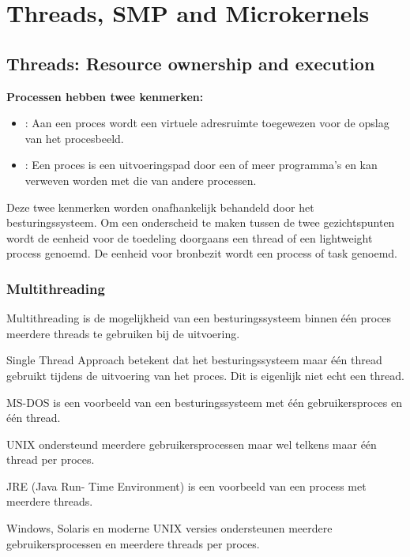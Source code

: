 \section{Threads, SMP and Microkernels}

\subsection{Threads: Resource ownership and execution}

\textbf{\textcolor{grayfilip}{Processen hebben twee kenmerken:}}

\begin{itemize}
    \item {} : Aan een proces wordt een virtuele adresruimte toegewezen voor de opslag van het procesbeeld.
    \item {}: Een proces is een uitvoeringspad door een of meer programma’s en kan verweven worden met die van andere processen.
\end{itemize}
	
Deze twee kenmerken worden onafhankelijk behandeld door het besturingssysteem.
Om een onderscheid te maken tussen de twee gezichtspunten wordt de eenheid voor de toedeling doorgaans een thread of een lightweight process genoemd. De eenheid voor bronbezit wordt een process of task genoemd.

\subsubsection{Multithreading}

Multithreading is de mogelijkheid van een besturingssysteem binnen één proces meerdere threads te gebruiken bij de uitvoering.

Single Thread Approach betekent dat het besturingssysteem maar één thread gebruikt tijdens de uitvoering van het proces. Dit is eigenlijk niet echt een thread.

MS-DOS is een voorbeeld van een besturingssysteem met één gebruikersproces en één thread.

UNIX ondersteund meerdere gebruikersprocessen maar wel telkens maar één thread per proces.

JRE (Java Run- Time Environment) is een voorbeeld van een process met meerdere threads.

Windows, Solaris en moderne UNIX versies ondersteunen meerdere gebruikersprocessen en meerdere threads per proces.

